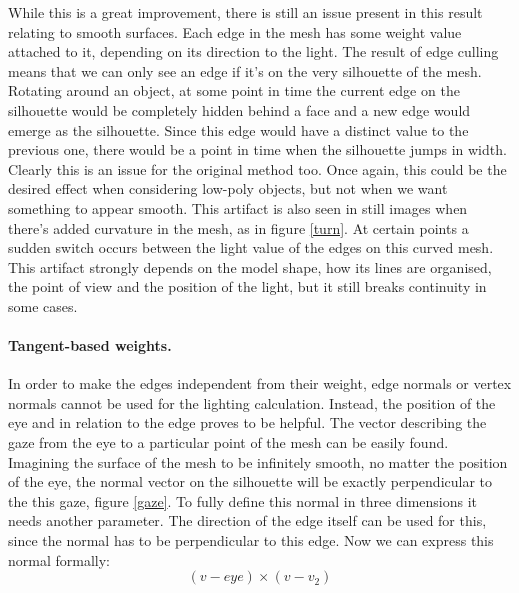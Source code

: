 \documentclass[a4paper, 12pt]{article}
\begin{document}
While this is a great improvement, there is still an issue present in this result relating to smooth surfaces. Each edge in the mesh has some weight value attached to it, depending on its direction to the light. The result of edge culling means that we can only see an edge if it's on the very silhouette of the mesh. Rotating around an object, at some point in time the current edge on the silhouette would be completely hidden behind a face and a new edge would emerge as the silhouette. Since this edge would have a distinct value to the previous one, there would be a point in time when the silhouette jumps in width. Clearly this is an issue for the original method too. Once again, this could be the desired effect when considering low-poly objects, but not when we want something to appear smooth. This artifact is also seen in still images when there's added curvature in the mesh, as in figure \ref{turn}. At certain points a sudden switch occurs between the light value of the edges on this curved mesh. This artifact strongly depends on the model shape, how its lines are organised, the point of view and the position of the light, but it still breaks continuity in some cases.

\paragraph{Tangent-based weights.}
In order to make the edges independent from their weight, edge normals or vertex normals cannot be used for the lighting calculation. Instead, the position of the eye and in relation to the edge proves to be helpful. The vector describing the gaze from the eye to a particular point of the mesh can be easily found. Imagining the surface of the mesh to be infinitely smooth, no matter the position of the eye, the normal vector on the silhouette will be exactly perpendicular to the this gaze, figure \ref{gaze}. To fully define this normal in three dimensions it needs another parameter. The direction of the edge itself can be used for this, since the normal has to be perpendicular to this edge. Now we can express this normal formally:
$$(v-eye) \times (v-v_2)$$
\end{document}
